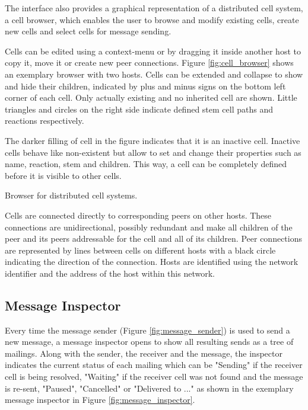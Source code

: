 The interface also provides a graphical representation of a distributed cell system, a cell browser, which enables the user to browse and modify existing cells, create new cells and select cells for message sending.

Cells can be edited using a context-menu or by dragging it inside another host to copy it, move it or create new peer connections. Figure \ref{fig:cell_browser} shows an exemplary browser with two hosts. Cells can be extended and collapse to show and hide their children, indicated by plus and minus signs on the bottom left corner of each cell. Only actually existing and no inherited cell are shown. Little triangles and circles on the right side indicate defined stem cell paths and reactions respectively.

The darker filling of cell  in the figure indicates that it is an inactive cell. Inactive cells behave like non-existent but allow to set and change their properties such as name, reaction, stem and children. This way, a cell can be completely defined before it is visible to other cells.

{Browser for distributed cell systems.}

Cells are connected directly to corresponding peers on other hosts. These connections are unidirectional, possibly redundant and make all children of the peer and its peers addressable for the cell and all of its children. Peer connections are represented by lines between cells on different hosts with a black circle indicating the direction of the connection. Hosts are identified using the network identifier and the address of the host within this network.

\subsection{Message Inspector}

Every time the message sender (Figure \ref{fig:message_sender}) is used to send a new message, a message inspector opens to show all resulting sends as a tree of mailings. Along with the sender, the receiver and the message, the inspector indicates the current status of each mailing which can be "Sending" if the receiver cell is being resolved, "Waiting" if the receiver cell was not found and the message is re-sent, "Paused", "Cancelled" or "Delivered to ..." as shown in the exemplary message inspector in Figure \ref{fig:message_inspector}.

